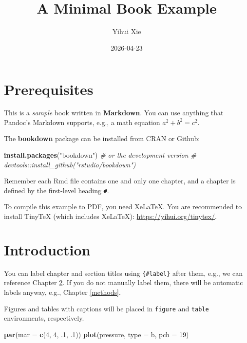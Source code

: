 \documentclass[
]{book}
\title{A Minimal Book Example}
\author{Yihui Xie}
\date{2026-04-23}
\newenvironment{Shaded}{\begin{snugshade}}{\end{snugshade}}
\newcommand{\AttributeTok}[1]{\textcolor[rgb]{0.13,0.29,0.53}{#1}}
\newcommand{\CommentTok}[1]{\textcolor[rgb]{0.56,0.35,0.01}{\textit{#1}}}
\newcommand{\DecValTok}[1]{\textcolor[rgb]{0.00,0.00,0.81}{#1}}
\newcommand{\FunctionTok}[1]{\textcolor[rgb]{0.13,0.29,0.53}{\textbf{#1}}}
\newcommand{\NormalTok}[1]{#1}
\newcommand{\StringTok}[1]{\textcolor[rgb]{0.31,0.60,0.02}{#1}}
\begin{document}
\maketitle

{
\setcounter{tocdepth}{1}
\tableofcontents
}
\chapter{Prerequisites}\label{prerequisites}

This is a \emph{sample} book written in \textbf{Markdown}. You can use anything that Pandoc's Markdown supports, e.g., a math equation \(a^2 + b^2 = c^2\).

The \textbf{bookdown} package can be installed from CRAN or Github:

\begin{Shaded}
\begin{Highlighting}[]
\FunctionTok{install.packages}\NormalTok{(}\StringTok{"bookdown"}\NormalTok{)}
\CommentTok{\# or the development version}
\CommentTok{\# devtools::install\_github("rstudio/bookdown")}
\end{Highlighting}
\end{Shaded}

Remember each Rmd file contains one and only one chapter, and a chapter is defined by the first-level heading \texttt{\#}.

To compile this example to PDF, you need XeLaTeX. You are recommended to install TinyTeX (which includes XeLaTeX): \url{https://yihui.org/tinytex/}.

\chapter{Introduction}\label{intro}

You can label chapter and section titles using \texttt{\{\#label\}} after them, e.g., we can reference Chapter \ref{intro}. If you do not manually label them, there will be automatic labels anyway, e.g., Chapter \ref{methods}.

Figures and tables with captions will be placed in \texttt{figure} and \texttt{table} environments, respectively.

\begin{Shaded}
\begin{Highlighting}[]
\FunctionTok{par}\NormalTok{(}\AttributeTok{mar =} \FunctionTok{c}\NormalTok{(}\DecValTok{4}\NormalTok{, }\DecValTok{4}\NormalTok{, .}\DecValTok{1}\NormalTok{, .}\DecValTok{1}\NormalTok{))}
\FunctionTok{plot}\NormalTok{(pressure, }\AttributeTok{type =} \StringTok{\textquotesingle{}b\textquotesingle{}}\NormalTok{, }\AttributeTok{pch =} \DecValTok{19}\NormalTok{)}
\end{Highlighting}
\end{Shaded}
\end{document}

